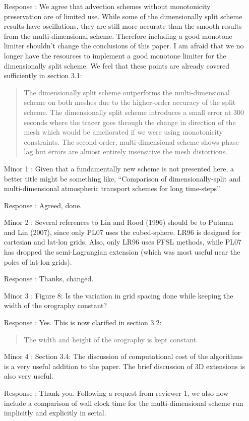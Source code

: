 \documentclass[12pt]{article}
\begin{document}
\begin{enumerate}
\item [Response]: We agree that advection schemes without monotonicity preservation are of limited use. While some of the dimensionally split scheme results have oscillations, they are still more accurate than the smooth results from the multi-dimensional scheme. Therefore including a good monotone limiter shouldn't change the conclusions of this paper. I am afraid that we no longer have the resources to implement a good monotone limiter for the dimensionally split scheme. We feel that these points are already covered sufficiently in section 3.1:
\begin{quote}
The dimensionally split scheme outperforms the multi-dimensional scheme on both meshes due to the higher-order accuracy of the split scheme. The dimensionally split scheme introduces a small error at 300 seconds where the tracer goes through the change in direction of the mesh which would be ameliorated if we were using monotonicity constraints. The second-order, multi-dimensional scheme shows phase lag but errors are almost entirely insensitive the mesh distortions. 
\end{quote}

\item [Minor  1]: Given that a fundamentally new scheme is not presented here, a better title might be something like, ``Comparison of dimensionally-split and multi-dimensional atmospheric transport schemes for long time-steps''

\item [Response]: Agreed, done.

\item [Minor  2]: Several references to Lin and Rood (1996) should be to Putman and Lin (2007), since only PL07 uses the cubed-sphere. LR96 is designed for cartesian and lat-lon grids. Also, only LR96 uses FFSL methods, while PL07 has dropped the semi-Lagrangian extension (which was most useful near the poles of lat-lon grids). 

\item [Response]: Thanks, changed.

\item [Minor  3]: Figure 8: Is the variation in grid spacing done while keeping the width of the orography constant? 

\item [Response]: Yes. This is now clarified in section 3.2:
\begin{quote}
The width and height of the orography is kept constant.
\end{quote}

\item [Minor  4]: Section 3.4: The discussion of computational cost of the algorithms is a very useful addition to the paper. The brief discussion of 3D extensions is also very useful.

\item [Response]: Thank-you. Following a request from reviewer 1, we also now include a comparison of wall clock time for the multi-dimensional scheme run implicitly and explicitly in serial. 
\end{enumerate}
\end{document}
